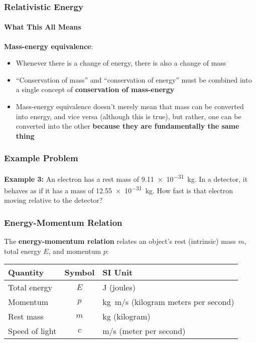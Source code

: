 \documentclass[12pt,compress,aspectratio=169]{beamer}
\newcommand{\eq}[2]{\vspace{#1}{\Large\begin{displaymath}#2\end{displaymath}}}
\begin{document}
\begin{frame}
  \frametitle{Relativistic Energy}
  \framesubtitle{What This All Means}
  
  \eq{-.2in}{
    \boxed{E=mc^2}
  }

  \textbf{Mass-energy equivalence}:
  \begin{itemize}
  \item Whenever there is a change of energy, there is also a change of mass
  \item ``Conservation of mass'' and ``conservation of energy'' must be
    combined into a single concept of \textbf{conservation of mass-energy}
  \item Mass-energy equivalence doesn't merely mean that mass can be converted
    into energy, and vice versa (although this is true), but rather, one can be
    converted into the other
    \textbf{because they are fundamentally the same thing}
  \end{itemize}
\end{frame}



\begin{frame}
  \frametitle{Example Problem}
  \textbf{Example 3:} An electron has a rest mass of \SI{9.11e-31}{\kilo\gram}.
  In a detector, it behaves as if it has a mass of \SI{12.55e-31}{\kilo\gram}.
  How fast is that electron moving relative to the detector?
\end{frame}


\begin{frame}
  \frametitle{Energy-Momentum Relation}
  The \textbf{energy-momentum relation} relates an object's rest (intrinsic)
  mass $m$, total energy $E$, and momentum $p$:

  \eq{-.2in}{
    \boxed{E^2=p^2c^2+m^2c^4}
  }
  \begin{center}
    \begin{tabular}{l|c|l}
      \rowcolor{pink}
      \textbf{Quantity} & \textbf{Symbol} & \textbf{SI Unit} \\ \hline
      Total energy   & $E$ & \si{\joule} (joules) \\
      Momentum       & $p$ & \si{\kilo\gram\metre/\second}
      (kilogram meters per second) \\
      Rest mass      & $m$ & \si{\kilo\gram} (kilogram)\\
      Speed of light & $c$ & \si{\metre/\second} (meter per second)
    \end{tabular}
  \end{center}
\end{frame}
\end{document}
